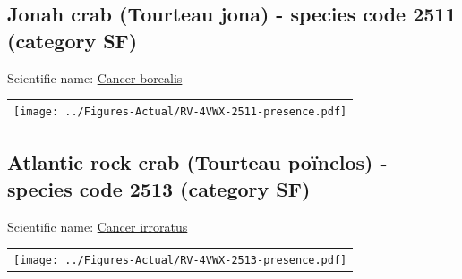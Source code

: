 \documentclass[12pt]{article}\usepackage[]{graphicx}\usepackage[]{color}
\begin{document}
\renewcommand\thefigure{\thesubsection\Alph{figure}}

\setcounter{figure}{0}

\hypertarget{sec:2511}{%
\subsection{Jonah crab (Tourteau jona) - species code 2511 (category SF)}\label{sec:2511}}

  


Scientific name: \href{http://www.marinespecies.org/aphia.php?p=taxdetails\&id=158056}{Cancer borealis} \newline
\begin{minipage}{1.0\textwidth}
 \begin{tabular}{c}
\texttt{[image: ../Figures-Actual/RV-4VWX-2511-presence.pdf]} \\ 
\end{tabular} 
\end{minipage}
\clearpage

\renewcommand\thefigure{\thesubsection\Alph{figure}}

\setcounter{figure}{0}

\hypertarget{sec:2513}{%
\subsection{Atlantic rock crab (Tourteau poïnclos) - species code 2513 (category SF)}\label{sec:2513}}

  


Scientific name: \href{http://www.marinespecies.org/aphia.php?p=taxdetails\&id=158057}{Cancer irroratus} \newline
\begin{minipage}{1.0\textwidth}
 \begin{tabular}{c}
\texttt{[image: ../Figures-Actual/RV-4VWX-2513-presence.pdf]} \\ 
\end{tabular} 
\end{minipage}
\clearpage

\renewcommand\thefigure{\thesubsection\Alph{figure}}
\end{document}
